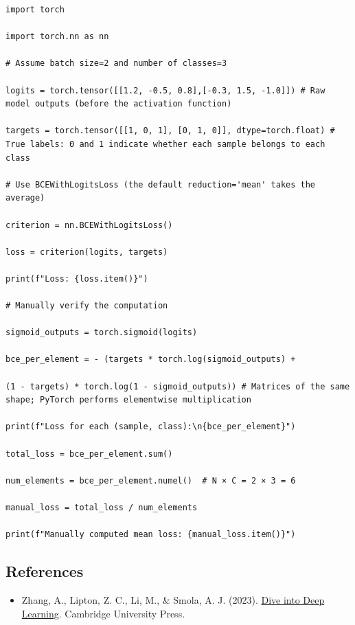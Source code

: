 \begin{verbatim}
import torch

import torch.nn as nn

# Assume batch size=2 and number of classes=3

logits = torch.tensor([[1.2, -0.5, 0.8],[-0.3, 1.5, -1.0]]) # Raw model outputs (before the activation function)

targets = torch.tensor([[1, 0, 1], [0, 1, 0]], dtype=torch.float) # True labels: 0 and 1 indicate whether each sample belongs to each class

# Use BCEWithLogitsLoss (the default reduction='mean' takes the average)

criterion = nn.BCEWithLogitsLoss()

loss = criterion(logits, targets)

print(f"Loss: {loss.item()}")

# Manually verify the computation

sigmoid_outputs = torch.sigmoid(logits)

bce_per_element = - (targets * torch.log(sigmoid_outputs) +

(1 - targets) * torch.log(1 - sigmoid_outputs)) # Matrices of the same shape; PyTorch performs elementwise multiplication

print(f"Loss for each (sample, class):\n{bce_per_element}")

total_loss = bce_per_element.sum()

num_elements = bce_per_element.numel()  # N × C = 2 × 3 = 6

manual_loss = total_loss / num_elements

print(f"Manually computed mean loss: {manual_loss.item()}")
\end{verbatim}

\FloatBarrier
{}
\hypertarget{references-4}{%
\subsection{References}\label{references-4}}

\vspace{0.25em}
\begin{itemize}
\tightlist
\item
  Zhang, A., Lipton, Z. C., Li, M., \& Smola, A. J. (2023). \href{https://D2L.ai}{Dive into Deep Learning}. Cambridge University Press.
\end{itemize}

\clearpage
